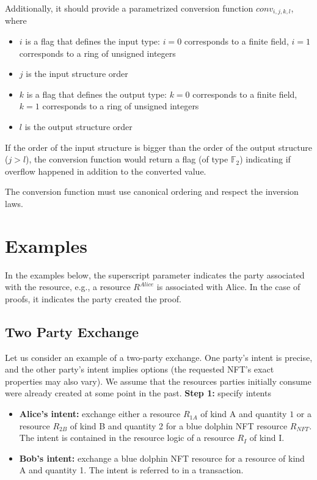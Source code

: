 \documentclass[
    11pt,            %
    techreport,        %
    affiltop,       %
]{art}
\begin{document}
Additionally, it should provide a parametrized conversion function $conv_{i,j,k,l}$, where
\begin{itemize}
    \item $i$ is a flag that defines the input type: $i = 0$ corresponds to a finite field, $i = 1$ corresponds to a ring of unsigned integers
    \item $j$ is the input structure order
    \item $k$ is a flag that defines the output type: $k = 0$ corresponds to a finite field, $k = 1$ corresponds to a ring of unsigned integers
    \item $l$ is the output structure order
    
\end{itemize}

If the order of the input structure is bigger than the order of the output structure ($j > l$), the conversion function would return a flag (of type $\mathbb{F}_2$) indicating if overflow happened in addition to the converted value.

The conversion function must use canonical ordering and respect the inversion laws.


\section{Examples}

In the examples below, the superscript parameter indicates the party associated with the resource, e.g., a resource $R^{Alice}$ is associated with Alice. In the case of proofs, it indicates the party created the proof.

\subsection{Two Party Exchange}

Let us consider an example of a two-party exchange. One party's intent is precise, and the other party's intent implies options (the requested NFT's exact properties may also vary). We assume that the resources parties initially consume were already created at some point in the past.
\hfill\break
\hfill\break
\textbf{Step 1:} specify intents

\begin{itemize}
    \item \textbf{Alice's intent:} exchange either a resource $R_{1A}$ of kind A and quantity $1$ or a resource $R_{2B}$ of kind B and quantity 2 for a blue dolphin NFT resource $R_{NFT}$. The intent is contained in the resource logic of a resource $R_{I}$ of kind I.
    \item \textbf{Bob's intent:} exchange a blue dolphin NFT resource for a resource of kind A and quantity 1. The intent is referred to in a transaction. 
\end{itemize}
\end{document}
